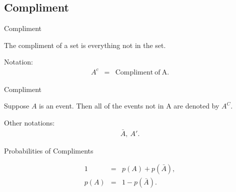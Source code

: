 \subsection{Compliment}

\begin{frame}{Compliment}

  The compliment of a set is everything not in the set.

  Notation:
  \begin{eqnarray*}
    A^c & = & \mathrm{Compliment~of~A}.
  \end{eqnarray*}

  
\end{frame}

\begin{frame}{Compliment}

  \begin{definition}
    Suppose $A$ is an event. Then all of the events not in A are denoted
    by $A^C$. 

    Other notations:
    \begin{eqnarray*}
      \bar{A},~A'.
    \end{eqnarray*}
  \end{definition}


\end{frame}




\begin{frame}{Probabilities of Compliments}
  
  \begin{eqnarray*}
    1 & = & p(A) + p(\bar{A}), \\
    p(A) & = & 1 - p(\bar{A}).
  \end{eqnarray*}

\end{frame}


